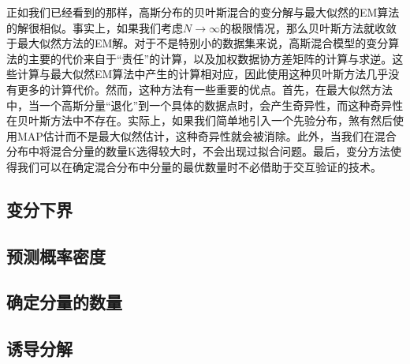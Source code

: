 正如我们已经看到的那样，高斯分布的贝叶斯混合的变分解与最大似然的EM算法的解很相似。事实上，如果我们考虑$N\to \infty$的极限情况，那么贝叶斯方法就收敛于最大似然方法的EM解。对于不是特别小的数据集来说，高斯混合模型的变分算法的主要的代价来自于“责任”的计算，以及加权数据协方差矩阵的计算与求逆。这些计算与最大似然EM算法中产生的计算相对应，因此使用这种贝叶斯方法几乎没有更多的计算代价。然而，这种方法有一些重要的优点。首先，在最大似然方法中，当一个高斯分量“退化”到一个具体的数据点时，会产生奇异性，而这种奇异性在贝叶斯方法中不存在。实际上，如果我们简单地引入一个先验分布，煞有然后使用MAP估计而不是最大似然估计，这种奇异性就会被消除。此外，当我们在混合分布中将混合分量的数量K选得较大时，不会出现过拟合问题。最后，变分方法使得我们可以在确定混合分布中分量的最优数量时不必借助于交互验证的技术。
\subsection*{变分下界}
\subsection*{预测概率密度}
\subsection*{确定分量的数量}
\subsection*{诱导分解}
